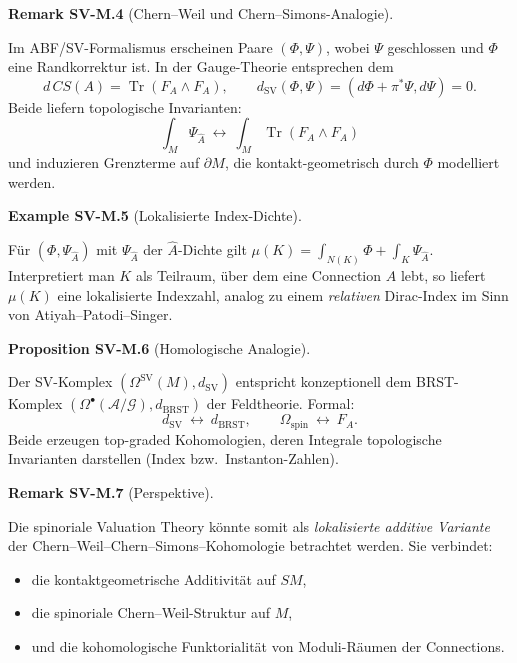 \documentclass[10pt, letterpaper]{article}
\newcommand{\CustomHeading}[3]{%
  \par\medskip\noindent%
  \textbf{#1 #2} \textnormal{(#3)}.\enskip%
}
\newenvironment{PROP}[2]{\begin{unitbox}\CustomHeading{Proposition}{#1}{#2}}{\end{unitbox}}
\newenvironment{REM}[2]{\begin{unitbox}\CustomHeading{Remark}{#1}{#2}}{\end{unitbox}}
\newenvironment{EXA}[2]{\begin{unitbox}\CustomHeading{Example}{#1}{#2}}{\end{unitbox}}
\begin{document}
\begin{REM}{SV-M.4}{Chern--Weil und Chern--Simons-Analogie}
Im ABF/SV-Formalismus erscheinen Paare $(\Phi,\Psi)$,
wobei $\Psi$ geschlossen und $\Phi$ eine Randkorrektur ist.
In der Gauge-Theorie entsprechen dem
\[
d\,CS(A)=\operatorname{Tr}(F_A\wedge F_A),\qquad d_{\operatorname{SV}}(\Phi,\Psi)=(d\Phi+\pi^*\Psi,d\Psi)=0.
\]
Beide liefern topologische Invarianten:
\[
\int_M \Psi_{\widehat A} \ \longleftrightarrow\ \int_M \operatorname{Tr}(F_A\wedge F_A)
\]
und induzieren Grenzterme auf $\partial M$, die kontakt-geometrisch durch $\Phi$ modelliert werden.
\end{REM}

\begin{EXA}{SV-M.5}{Lokalisierte Index-Dichte}
Für $(\Phi,\Psi_{\widehat A})$ mit $\Psi_{\widehat A}$ der $\widehat A$-Dichte
gilt $\mu(K)=\int_{N(K)}\Phi+\int_K\Psi_{\widehat A}$.
Interpretiert man $K$ als Teilraum, über dem eine Connection $A$ lebt,
so liefert $\mu(K)$ eine lokalisierte Indexzahl, analog zu einem \emph{relativen} Dirac-Index
im Sinn von Atiyah--Patodi--Singer.
\end{EXA}

\begin{PROP}{SV-M.6}{Homologische Analogie}
Der SV-Komplex $(\Omega^{\operatorname{SV}}(M),d_{\operatorname{SV}})$
entspricht konzeptionell dem BRST-Komplex $(\Omega^\bullet(\mathcal A/\mathcal G),d_{\mathrm{BRST}})$
der Feldtheorie. Formal:
\[
d_{\operatorname{SV}}\ \leftrightarrow\ d_{\mathrm{BRST}},\qquad
\Omega_{\mathrm{spin}}\ \leftrightarrow\ F_A.
\]
Beide erzeugen top-graded Kohomologien,
deren Integrale topologische Invarianten darstellen (Index bzw.\ Instanton-Zahlen).
\end{PROP}

\begin{REM}{SV-M.7}{Perspektive}
Die spinoriale Valuation Theory könnte somit als
\emph{lokalisierte additive Variante}
der Chern--Weil--Chern--Simons–Kohomologie betrachtet werden.
Sie verbindet:
\begin{itemize}
\item die kontaktgeometrische Additivität auf $SM$,
\item die spinoriale Chern--Weil-Struktur auf $M$,
\item und die kohomologische Funktorialität von Moduli-Räumen der Connections.
\end{itemize}
\end{REM}

\pagebreak
\end{document}
